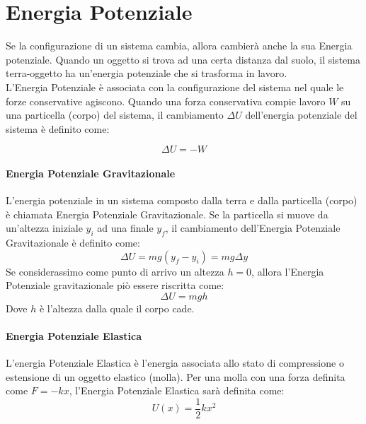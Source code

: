     \section{Energia Potenziale} Se la configurazione di un sistema cambia, 
    allora cambierà anche la sua Energia potenziale. Quando un oggetto si trova
    ad una certa distanza dal suolo, il sistema terra-oggetto ha un'energia 
    potenziale che si trasforma in lavoro. \\
    L'Energia Potenziale è associata con la configurazione del sistema nel 
    quale le forze conservative agiscono. Quando una forza conservativa compie 
    lavoro $W$ su una particella (corpo) del sistema, il cambiamento $\Delta U$ 
    dell'energia potenziale del sistema è definito come:
        
        \begin{equation}
            \Delta U = - W
        \end{equation}

        \paragraph{Energia Potenziale Gravitazionale} L'energia potenziale in 
        un sistema composto dalla terra e dalla particella (corpo) è chiamata 
        Energia Potenziale Gravitazionale. Se la particella si muove da 
        un'altezza iniziale $y_i$ ad una finale $y_f$, il cambiamento 
        dell'Energia Potenziale Gravitazionale è definito come:
        \begin{equation}
            \Delta U = mg(y_f - y_i) = mg \Delta y
        \end{equation}
        Se considerassimo come punto di arrivo un altezza $ h = 0$, allora 
        l'Energia Potenziale gravitazionale piò essere riscritta come:
        \begin{equation}
            \Delta U = mgh
        \end{equation}
        Dove $h$ è l'altezza dalla quale il corpo cade.

        \paragraph{Energia Potenziale Elastica} L'energia Potenziale Elastica è 
        l'energia associata allo stato di compressione o estensione di un 
        oggetto elastico (molla). Per una molla con una forza definita come 
        $ F = -kx $, l'Energia Potenziale Elastica sarà definita come:
        \begin{equation}
            U(x)     = \frac{1}{2}kx^2
        \end{equation}

